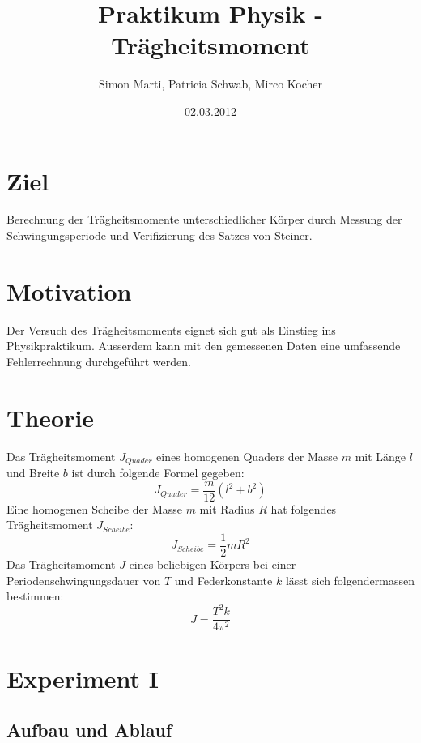 \documentclass[12pt,a4paper]{article}
\title{Praktikum Physik - Tr\"agheitsmoment}
\author{Simon Marti, Patricia Schwab, Mirco Kocher}
\date{02.03.2012}
\begin{document}
\maketitle

\section*{Ziel}
Berechnung der Tr\"agheitsmomente unterschiedlicher K\"orper durch Messung der Schwingungsperiode und Verifizierung des Satzes von Steiner.

\section*{Motivation}
Der Versuch des Tr\"agheitsmoments eignet sich gut als Einstieg ins Physikpraktikum. Ausserdem kann mit den gemessenen Daten eine umfassende Fehlerrechnung durchgef\"uhrt werden.

\section*{Theorie}
Das Tr\"agheitsmoment $J_{Quader}$ eines homogenen Quaders der Masse $m$ mit L\"ange $l$ und Breite $b$ ist durch folgende Formel gegeben:
\begin{equation}
 J_{Quader} = \frac{m}{12}(l^2 + b^2)
\end{equation}
Eine homogenen Scheibe der Masse $m$ mit Radius $R$ hat folgendes Tr\"agheitsmoment $J_{Scheibe}$:
\begin{equation}
J_{Scheibe} = \frac{1}{2}mR^2
\end{equation}
Das Tr\"agheitsmoment $J$ eines beliebigen K\"orpers bei einer Periodenschwingungsdauer von $T$ und Federkonstante $k$  l\"asst sich folgendermassen bestimmen:
\begin{equation} \label{eq:k}
J = \frac{T^2k}{4\pi^2}
\end{equation}

\section*{Experiment I}

\subsection*{Aufbau und Ablauf}
\end{document}
